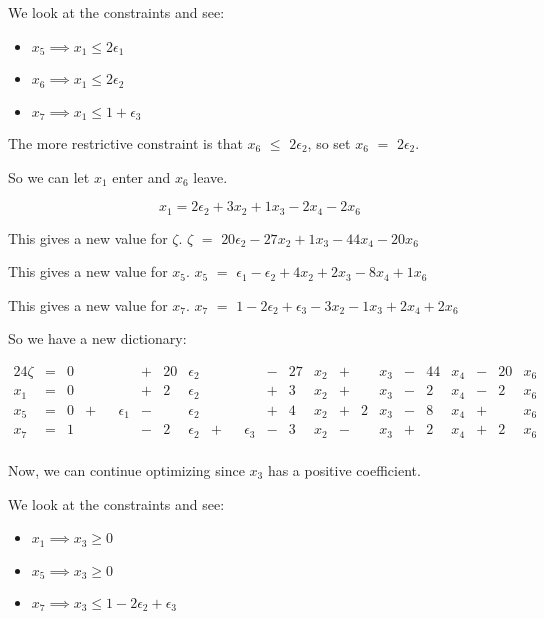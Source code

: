 \documentclass[12pt,letterpaper]{article}
\newcommand*\seeconstraints{
  We look at the constraints and see:
}
\newcommand*\continueopt[1]{
  Now, we can continue optimizing since #1 has a positive coefficient.
}
\newcommand*\enterleave[2]{
  So we can let #1 enter and #2 leave.
}
\newcommand*\morerestrictive[2]{
  The more restrictive constraint is that #1 $\leq$ #2, so set #1 $=$ #2.
}
\newcommand*\newdict{
  So we have a new dictionary:
}
\newcommand*\newvalue[2]{
  This gives a new value for #1. #1 $ = $ #2
}
\newcommand*\eps{\epsilon}
\begin{document}
\begin{enumerate}
      \seeconstraints

      \begin{itemize}
        \item $x_5 \implies x_1 \leq 2\eps_1$
        \item $x_6 \implies x_1 \leq 2\eps_2$
        \item $x_7 \implies x_1 \leq 1 + \eps_3$
      \end{itemize}

      \morerestrictive{$x_6$}{$2\eps_2$}

      \enterleave{$x_1$}{$x_6$}

      \[
        x_1 = 2\eps_2 + 3 x_2 + 1 x_3 - 2 x_4 - 2 x_6
      \]

      \newvalue{$\zeta$}{$20\eps_2 - 27 x_2 + 1 x_3 - 44 x_4 - 20 x_6$}

      \newvalue{$x_5$}{$\eps_1 - \eps_2 + 4 x_2 + 2 x_3 - 8 x_4 + 1 x_6$}

      \newvalue{$x_7$}{$1 - 2\eps_2 + \eps_3 - 3 x_2 - 1 x_3 + 2 x_4 + 2 x_6$}

      \newdict

      \begin{alignat*}{24}
        \zeta & {}={} & 0 &       & &        & {}+{} & 20 & \eps_2 &       & &        & {}-{} & 27 & x_2 & {}+{} &   & x_3 & {}-{} & 44 & x_4 & {}-{} & 20 & x_6 \\
        x_1   & {}={} & 0 &       & &        & {}+{} & 2  & \eps_2 &       & &        & {}+{} & 3  & x_2 & {}+{} &   & x_3 & {}-{} & 2  & x_4 & {}-{} & 2  & x_6 \\
        x_5   & {}={} & 0 & {}+{} & & \eps_1 & {}-{} &    & \eps_2 &       & &        & {}+{} & 4  & x_2 & {}+{} & 2 & x_3 & {}-{} & 8  & x_4 & {}+{} &    & x_6 \\
        x_7   & {}={} & 1 &       & &        & {}-{} & 2  & \eps_2 & {}+{} & & \eps_3 & {}-{} & 3  & x_2 & {}-{} &   & x_3 & {}+{} & 2  & x_4 & {}+{} & 2  & x_6 \\
      \end{alignat*}

      \continueopt{$x_3$}

      \seeconstraints

      \begin{itemize}
        \item $x_1 \implies x_3 \geq 0$
        \item $x_5 \implies x_3 \geq 0$
        \item $x_7 \implies x_3 \leq 1 - 2\eps_2 + \eps_3$
      \end{itemize}


\end{enumerate}
\end{document}
